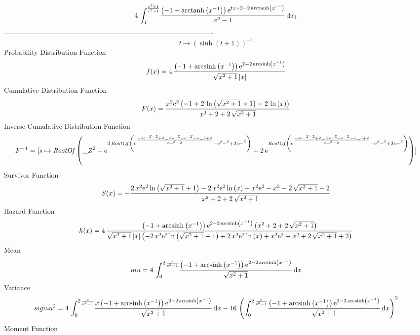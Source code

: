 \documentclass[12pt]{article}
\begin{document}
 $$4\,\int_{1}^{{\frac {{{\rm e}^{2}}+1}{{{\rm e}^{2}}-1}}}\!{\frac {
 \left( -1+{\rm arctanh} \left({x}^{-1}\right) \right) {{\rm e}^{tx+2-
2\,{\rm arctanh} \left({x}^{-1}\right)}}}{{x}^{2}-1}}\,{\rm d}x_{{1}}
$$-------------------------------------------------------------------------------------------  \\$$t\mapsto  \left( \sinh \left( t+1 \right)  \right) ^{-1}
$$Probability Distribution Function 
$$  f(x)=4\,{\frac { \left( -1+{\rm arcsinh} \left({x}^{-1}\right) \right) {
{\rm e}^{2-2\,{\rm arcsinh} \left({x}^{-1}\right)}}}{\sqrt {{x}^{2}+1}
 \left| x \right| }}
$$Cumulative Distribution Function  
 $$F(x)={\frac {{x}^{2}{{\rm e}^{2}} \left( -1+2\,\ln  \left( \sqrt {{x}^{2}+1
}+1 \right) -2\,\ln  \left( x \right)  \right) }{{x}^{2}+2+2\,\sqrt {{
x}^{2}+1}}}
$$ Inverse Cumulative Distribution Function 
  $$F^{-1} = [s\mapsto {\it RootOf} \left( {{\it \_Z}}^{2}-{{\rm e}^{2\,{\it RootOf
} \left( {{\rm e}^{{\frac {-s{{\rm e}^{{\it \_Z}-2}}+2\,{\it \_Z}\,{
{\rm e}^{{\it \_Z}}}-{{\rm e}^{{\it \_Z}}}-4\,{\it \_Z}+2}{{{\rm e}^{{
\it \_Z}}}-2}}}}-{{\rm e}^{2\,{\it \_Z}}}+2\,{{\rm e}^{{\it \_Z}}}
 \right) }}+2\,{{\rm e}^{{\it RootOf} \left( {{\rm e}^{{\frac {-s{
{\rm e}^{{\it \_Z}-2}}+2\,{\it \_Z}\,{{\rm e}^{{\it \_Z}}}-{{\rm e}^{{
\it \_Z}}}-4\,{\it \_Z}+2}{{{\rm e}^{{\it \_Z}}}-2}}}}-{{\rm e}^{2\,{
\it \_Z}}}+2\,{{\rm e}^{{\it \_Z}}} \right) }} \right) ]
$$Survivor Function 
 $$ S(x)=-{\frac {2\,{x}^{2}{{\rm e}^{2}}\ln  \left( \sqrt {{x}^{2}+1}+1
 \right) -2\,{x}^{2}{{\rm e}^{2}}\ln  \left( x \right) -{x}^{2}{
{\rm e}^{2}}-{x}^{2}-2\,\sqrt {{x}^{2}+1}-2}{{x}^{2}+2+2\,\sqrt {{x}^{
2}+1}}}
$$ Hazard Function 
 $$ h(x)=4\,{\frac { \left( -1+{\rm arcsinh} \left({x}^{-1}\right) \right) {
{\rm e}^{2-2\,{\rm arcsinh} \left({x}^{-1}\right)}} \left( {x}^{2}+2+2
\,\sqrt {{x}^{2}+1} \right) }{\sqrt {{x}^{2}+1} \left| x \right| 
 \left( -2\,{x}^{2}{{\rm e}^{2}}\ln  \left( \sqrt {{x}^{2}+1}+1
 \right) +2\,{x}^{2}{{\rm e}^{2}}\ln  \left( x \right) +{x}^{2}{
{\rm e}^{2}}+{x}^{2}+2\,\sqrt {{x}^{2}+1}+2 \right) }}
$$Mean 
 $$ mu=4\,\int_{0}^{2\,{\frac {{\rm e}}{{{\rm e}^{2}}-1}}}\!{\frac { \left( -
1+{\rm arcsinh} \left({x}^{-1}\right) \right) {{\rm e}^{2-2\,
{\rm arcsinh} \left({x}^{-1}\right)}}}{\sqrt {{x}^{2}+1}}}\,{\rm d}x
$$ Variance 
 $$ sigma^2 = 4\,\int_{0}^{2\,{\frac {{\rm e}}{{{\rm e}^{2}}-1}}}\!{\frac {x \left( 
-1+{\rm arcsinh} \left({x}^{-1}\right) \right) {{\rm e}^{2-2\,
{\rm arcsinh} \left({x}^{-1}\right)}}}{\sqrt {{x}^{2}+1}}}\,{\rm d}x-
16\, \left( \int_{0}^{2\,{\frac {{\rm e}}{{{\rm e}^{2}}-1}}}\!{\frac {
 \left( -1+{\rm arcsinh} \left({x}^{-1}\right) \right) {{\rm e}^{2-2\,
{\rm arcsinh} \left({x}^{-1}\right)}}}{\sqrt {{x}^{2}+1}}}\,{\rm d}x
 \right) ^{2}
$$Moment Function 
\end{document}
